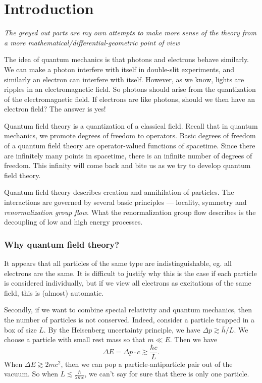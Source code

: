 \documentclass[a4paper]{article}
\begin{document}
\setcounter{section}{-1}
\section{Introduction}
\emph{The greyed out parts are my own attempts to make more sense of the theory from a more mathematical/differential-geometric point of view}

The idea of quantum mechanics is that photons and electrons behave similarly. We can make a photon interfere with itself in double-slit experiments, and similarly an electron can interfere with itself. However, as we know, lights are ripples in an electromagnetic field. So photons should arise from the quantization of the electromagnetic field. If electrons are like photons, should we then have an electron field? The answer is yes!

Quantum field theory is a quantization of a classical field. Recall that in quantum mechanics, we promote degrees of freedom to operators. Basic degrees of freedom of a quantum field theory are operator-valued functions of spacetime. Since there are infinitely many points in spacetime, there is an infinite number of degrees of freedom. This infinity will come back and bite us as we try to develop quantum field theory.

Quantum field theory describes creation and annihilation of particles. The interactions are governed by several basic principles --- locality, symmetry and \emph{renormalization group flow}. What the renormalization group flow describes is the decoupling of low and high energy processes.

\subsubsection*{Why quantum field theory?}
It appears that all particles of the same type are indistinguishable, eg. all electrons are the same. It is difficult to justify why this is the case if each particle is considered individually, but if we view all electrons as excitations of the same field, this is (almost) automatic.

Secondly, if we want to combine special relativity and quantum mechanics, then the number of particles is not conserved. Indeed, consider a particle trapped in a box of size $L$. By the Heisenberg uncertainty principle, we have $\Delta p \gtrsim \bar{h}/L$. We choose a particle with small rest mass so that $m \ll E$. Then we have
\[
  \Delta E = \Delta p \cdot c \gtrsim \frac{\hbar c}{L}.
\]
When $\Delta E \gtrsim 2 mc^2$, then we can pop a particle-antiparticle pair out of the vacuum. So when $L \lesssim \frac{\hbar}{2mc}$, we can't say for sure that there is only one particle.
\end{document}
